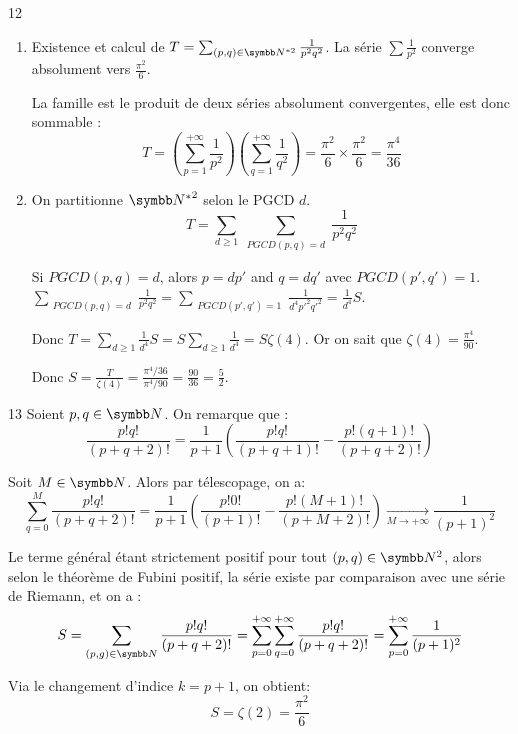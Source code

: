 \begin{correction}{12}
\begin{enumerate}
    \item Existence et calcul de $T = \sum_{(p,q)\in\N^{*2}}\frac{1}{p^{2}q^{2}}$.
        La série $\sum \frac{1}{p^2}$ converge absolument vers $\frac{\pi^2}{6}$.

        La famille est le produit de deux séries absolument convergentes, elle est donc sommable :
        $$T = \left(\sum_{p=1}^{+\infty} \frac{1}{p^2}\right) \left(\sum_{q=1}^{+\infty} \frac{1}{q^2}\right) = \frac{\pi^2}{6} \times \frac{\pi^2}{6} = \frac{\pi^4}{36}$$

    \item On partitionne ${\N^{*}}^2$ selon le PGCD $d$.
        $$T = \sum_{d \geqslant 1} \sum_{\substack{PGCD(p,q)=d}} \frac{1}{p^2 q^2}$$
        
        Si $PGCD(p,q)=d$, alors $p=dp'$ and $q=dq'$ avec $PGCD(p',q')=1$.
        $\sum_{\substack{PGCD(p,q)=d}} \frac{1}{p^2 q^2} = \sum_{\substack{PGCD(p',q')=1}} \frac{1}{d^4 p'^2 q'^2} = \frac{1}{d^4} S$.

        Donc $T = \sum_{d \geqslant 1} \frac{1}{d^4} S = S \sum_{d \geqslant 1} \frac{1}{d^4} = S \zeta(4)$.
        Or on sait que $\zeta(4) = \frac{\pi^4}{90}$.

        Donc $S = \frac{T}{\zeta(4)} = \frac{\pi^4/36}{\pi^4/90} = \frac{90}{36} = \frac{5}{2}$.
\end{enumerate}
\end{correction}

\begin{correction}{13}
Soient $p,q \in \N$. On remarque que :
    \[ \frac{p! q!}{(p+q+2)!} = \frac{1}{p+1} \left(\frac{p! q!}{(p+q+1)!} - \frac{p! (q+1)!}{(p+q+2)!} \right) \]
    
    Soit $M \in \N$. Alors par télescopage, on a:
    \[ \sum_{q=0}^{M} \frac{p! q!}{(p+q+2)!} = \frac{1}{p+1} \left( \frac{p! 0!}{(p+1)!} - \frac{p! (M+1)!}{(p+M+2)!} \right) \xrightarrow[M \to +\infty]{} \frac{1}{(p+1)^2} \]
    
    Le terme général étant strictement positif pour tout $(p,q) \in \N^2$, alors selon le théorème de Fubini positif, 
    la série existe par comparaison avec une série de Riemann, et on a :
    \[S = \sum_{(p,g) \in \N}^{} \frac{p!q!}{(p+q+2)!} = \sum_{p=0}^{+\infty} \sum_{q=0}^{+\infty} \frac{p!q!}{(p+q+2)!} = \sum_{p=0}^{+\infty} \frac{1}{(p+1)^2} \]
    
    Via le changement d'indice $k = p+1$, on obtient: \[S = \zeta(2) = \frac{\pi^2}{6}\]
\end{correction}

